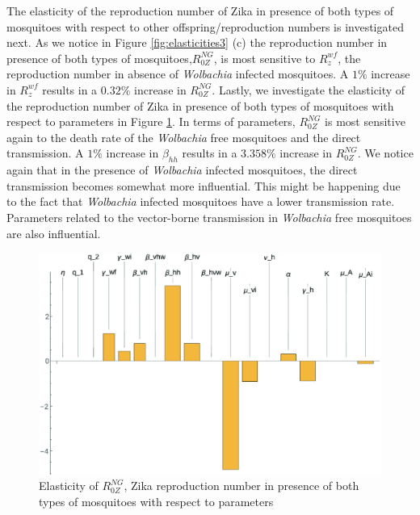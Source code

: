 \documentclass{ws-rv9x6}
\begin{document}
The elasticity of the reproduction number of Zika in presence of both types of mosquitoes with respect to other offspring/reproduction numbers is investigated next. As we notice in Figure \ref{fig:elasticities3} (c) the reproduction number in presence of both types of mosquitoes,$R^{NG}_{0Z}$, is most sensitive to $R_z^{wf}$, the reproduction number in absence of \textit{Wolbachia} infected mosquitoes. A $1\%$ increase in $R_z^{wf}$ results in a $0.32\%$ increase in $R^{NG}_{0Z}$.
Lastly, we investigate the elasticity of the reproduction number of Zika in presence of both types of mosquitoes with respect to  parameters in Figure \ref{fig:elasticities4}. In terms of parameters, $R^{NG}_{0Z}$ is most sensitive again to the death rate of the \textit{Wolbachia} free mosquitoes and the direct transmission. A $1\%$ increase in $\beta_{hh}$ results in a $3.358\%$ increase in $R^{NG}_{0Z}$. We notice again that in the presence of \textit{Wolbachia} infected mosquitoes, the direct transmission becomes somewhat more influential. This might be happening due to the fact that \textit{Wolbachia} infected mosquitoes have a lower transmission rate. Parameters related to the vector-borne transmission in \textit{Wolbachia} free mosquitoes are also influential.
\begin{figure}[H]%
    \centering
    \includegraphics[width=0.95\columnwidth]{fig/eps/ER0Param.eps}%
    \caption{Elasticity of $R_{0Z}^{NG}$, Zika reproduction number in presence of both types of mosquitoes with respect to parameters}
    \label{fig:elasticities4}%
\end{figure} 
\end{document}
